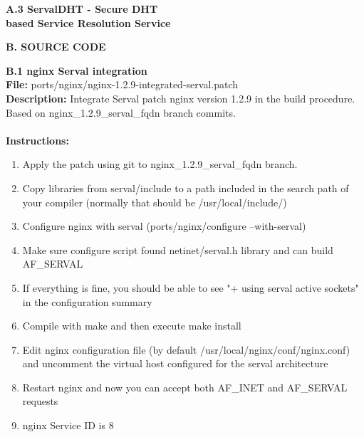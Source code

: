 \newpage
{}
{}
\label{sec:servaldhtpres}
{\huge \bf \noindent A.3 ServalDHT - Secure DHT\\[0.2cm] based Service Resolution Service}




\newpage
{}
{}
\label{sec:sourcecode}
{\Huge \bf \noindent B. SOURCE CODE}


\newpage
{}
{}
\label{sec:nginxport}
{\huge \bf \noindent B.1 nginx Serval integration}\\[0.5cm]
\textbf{File:} ports/nginx/nginx-1.2.9-integrated-serval.patch\\
\textbf{Description:} Integrate Serval patch nginx version 1.2.9 in the build procedure. Based on nginx\_1.2.9\_serval\_fqdn branch commits.\\\\
\textbf{Instructions: }
\begin{enumerate} \itemsep1pt \parskip0pt 
	\item Apply the patch using git to nginx\_1.2.9\_serval\_fqdn branch.
	\item Copy libraries from serval/include to a path included in the search path of your compiler (normally that should be /usr/local/include/)
	\item Configure nginx with serval (ports/nginx/configure --with-serval)
	\item Make sure configure script found netinet/serval.h library and can build AF\_SERVAL
	\item If everything is fine, you should be able to see "+ using serval active sockets" in the configuration summary
	\item Compile with make and then execute make install
	\item Edit nginx configuration file (by default /usr/local/nginx/conf/nginx.conf) and uncomment the virtual host configured for the serval architecture
	\item Restart nginx and now you can accept both AF\_INET and AF\_SERVAL requests
	\item nginx Service ID is 8\\[0.5cm]
\end{enumerate}


